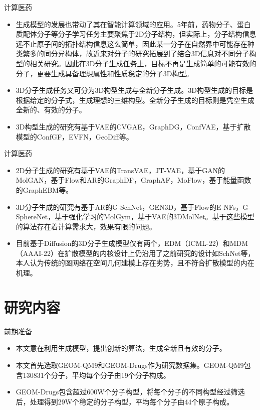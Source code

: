 \documentclass{beamer}
\begin{document}
\begin{frame}{计算医药}
    \begin{itemize}
        \item 生成模型的发展也带动了其在智能计算领域的应用。5年前，药物分子、蛋白质配体分子等分子学习任务主要聚焦于2D分子结构，但实际上，分子结构信息远不止原子间的拓扑结构信息这么简单，因此某一分子在自然界中可能存在种类繁多的同分异构体，故近来对分子的研究拓展到了结合3D信息对不同分子构型的相关研究。因此在3D分子生成任务上，目标不再是生成简单的可能有效的分子，更要生成具备理想属性和性质稳定的分子3D构型。
        \item 3D分子生成任务又可分为3D构型生成与全新分子生成。3D构型生成的目标是根据给定的分子式，生成理想的三维构型。全新分子生成的目标则是凭空生成全新的、有效的分子。
        \item 3D构型生成的研究有基于VAE的CVGAE，GraphDG，ConfVAE，基于扩散模型的ConfGF，EVFN，GeoDiff等。
    \end{itemize}
\end{frame}
\begin{frame}{计算医药}
    \begin{itemize}
        \item 2D分子生成的研究有基于VAE的TransVAE，JT-VAE，基于GAN的MolGAN，基于Flow和AR的GraphDF，GraphAF，MoFlow，基于能量函数的GraphEBM等。
        \item 3D分子生成的研究有基于AR的G-SchNet，GEN3D，基于Flow的E-NFs，G-SphereNet，基于强化学习的MolGym，基于VAE的3DMolNet。基于这些模型的算法存在着计算需求大，效果有限的问题。
        \item 目前基于Diffusion的3D分子生成模型仅有两个，EDM（ICML-22）\cite{edm_icml_hoogeboom_22}和MDM（AAAI-22）\cite{mdm_aaai_huang_22}在扩散模型的内核设计上仍沿用了之前研究的设计如SchNet\cite{schnet_schutt_17}等，本人认为传统的图网络在空间几何建模上存在劣势，且不符合扩散模型的内在机理。
    \end{itemize}
\end{frame}

\section{研究内容}
\begin{frame}{前期准备}
    \begin{itemize}
        \item \textcolor[rgb]{0.827,0.318,0.298}{本文意在利用生成模型，提出创新的算法，生成全新且有效的分子。}
        \item 本文首先选取GEOM-QM9和GEOM-Drugs作为研究数据集。GEOM-QM9包含130831个分子，平均每个分子由19个分子构成。
        \item GEOM-Drugs包含超过600W个分子构型，将每个分子的不同构型经过筛选后，处理得到29W个稳定的分子构型，平均每个分子由44个原子构成。
    \end{itemize}
\end{frame}
\end{document}
